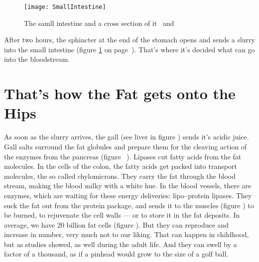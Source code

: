 \documentclass[../main.tex]{subfiles}
\begin{document}
\begin{figure}[htb!]
  \texttt{[image: SmallIntestine]}
  \caption{The samll intestine and a cross section of it~\cite{SmallInt} and~\cite{LayersInt}}\label{SmallInt}
  \end{figure}


 
After two hours, the sphincter at the end of the stomach opens and sends a slurry into the small intestine
(figure \ref{SmallInt} on page~\pageref{SmallInt}).
That's where it's decided what can go into the bloodstream.


\section{That's how the Fat gets onto the Hips}

As soon as the slurry arrives, the gall (see liver in figure %
) sends it's acidic juice.
Gall salts surround the fat globules and prepare them for the cleaving action of the enzymes from the pancreas (figure~%
).
Lipases cut fatty acids from the fat molecules.
In the cells of the colon, the fatty acids get packed into transport molecules, the so called chylomicrons.
They carry the fat through the blood stream, making the blood milky with a white hue.
In the blood vessels, there are enzymes, which are waiting for these energy deliveries: lipo--protein lipases.
They suck the fat out from the protein package, and sends it to the muscles (figure%
) to be burned, to rejuvenate the cell walls --- or to store it in the fat deposits.
In average, we have 20 billion fat cells (figure%
).
But they can reproduce and increase in number, very much not to our liking.
That can happen in childhood, but as studies showed, as well during the adult life.
And they can swell by a factor of a thousand, as if a pinhead would grow to the size of a golf ball.
\end{document}
